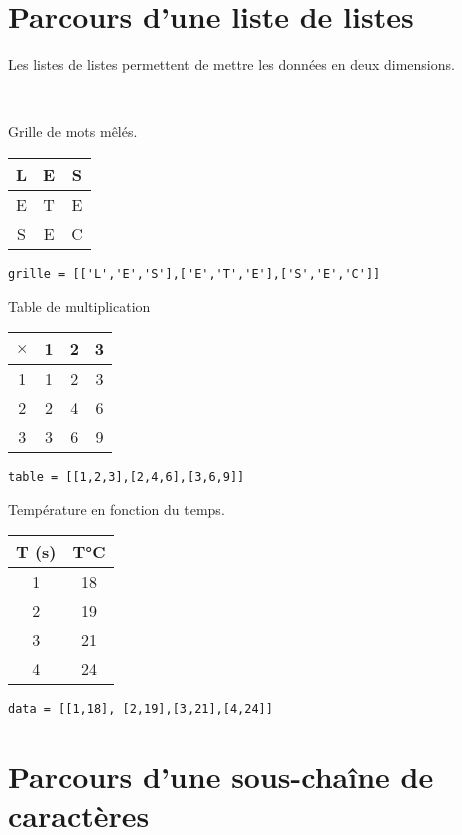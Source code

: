 \section{Parcours d'une liste de listes}
Les listes de listes permettent de mettre les données en deux dimensions. 
\begin{exemple}
~\\
\begin{multicols}{3}
Grille de mots mêlés.
\begin{center}
\begin{tabular}{|c|c|c|}
\hline
L & E & S \\ \hline
E & T & E \\ \hline
S & E & C \\ \hline
\end{tabular}
\end{center}

\begin{lstlisting}
grille = [['L','E','S'],['E','T','E'],['S','E','C']]
\end{lstlisting}

\vfill\null
\columnbreak

Table de multiplication
\begin{center}
\begin{tabular}{|c||c|c|c|}
\hline
$\times $ & 1 & 2 & 3 \\
\hline
\hline
1 & 1 & 2 & 3 \\
2 & 2 & 4 &  6 \\
3 & 3 & 6 &  9 \\
\hline
\end{tabular}
\end{center}

\begin{lstlisting}
table = [[1,2,3],[2,4,6],[3,6,9]]
\end{lstlisting}

\vfill\null
\columnbreak

Température en fonction du temps.

\begin{center}
\begin{tabular}{|c|c|}
\hline
T (s)& T°C \\
\hline \hline
1 & 18 \\ \hline
2 & 19 \\ \hline
3 & 21 \\ \hline
4  & 24 \\ \hline
\end{tabular}
\end{center}

\begin{lstlisting}
data = [[1,18], [2,19],[3,21],[4,24]]
\end{lstlisting}



\end{multicols}
\end{exemple}

\section{Parcours d'une sous-chaîne de caractères}

